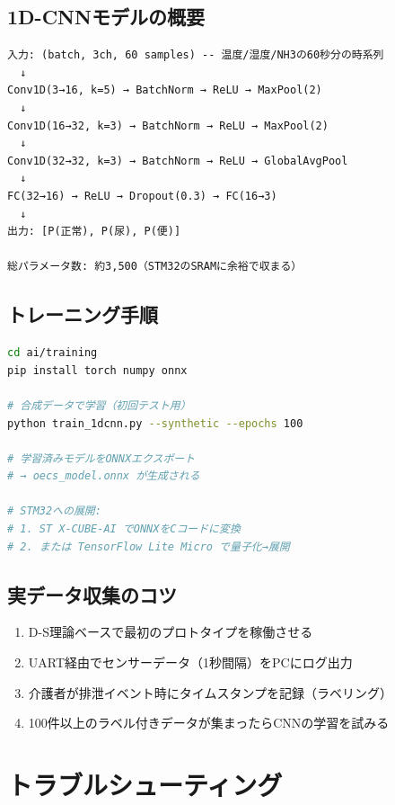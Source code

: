 \documentclass[a4paper,11pt]{article}
\begin{document}
\subsection{1D-CNNモデルの概要}

\begin{verbatim}
入力: (batch, 3ch, 60 samples) -- 温度/湿度/NH3の60秒分の時系列
  ↓
Conv1D(3→16, k=5) → BatchNorm → ReLU → MaxPool(2)
  ↓
Conv1D(16→32, k=3) → BatchNorm → ReLU → MaxPool(2)
  ↓
Conv1D(32→32, k=3) → BatchNorm → ReLU → GlobalAvgPool
  ↓
FC(32→16) → ReLU → Dropout(0.3) → FC(16→3)
  ↓
出力: [P(正常), P(尿), P(便)]

総パラメータ数: 約3,500（STM32のSRAMに余裕で収まる）
\end{verbatim}

\subsection{トレーニング手順}

\begin{lstlisting}[language=bash]
cd ai/training
pip install torch numpy onnx

# 合成データで学習（初回テスト用）
python train_1dcnn.py --synthetic --epochs 100

# 学習済みモデルをONNXエクスポート
# → oecs_model.onnx が生成される

# STM32への展開:
# 1. ST X-CUBE-AI でONNXをCコードに変換
# 2. または TensorFlow Lite Micro で量子化→展開
\end{lstlisting}

\subsection{実データ収集のコツ}

\begin{enumerate}[leftmargin=2em]
  \item D-S理論ベースで最初のプロトタイプを稼働させる
  \item UART経由でセンサーデータ（1秒間隔）をPCにログ出力
  \item 介護者が排泄イベント時にタイムスタンプを記録（ラベリング）
  \item 100件以上のラベル付きデータが集まったらCNNの学習を試みる
\end{enumerate}

\newpage
\section{トラブルシューティング}
\end{document}
